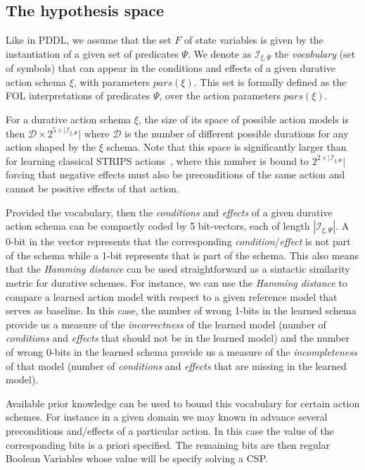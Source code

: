 \documentclass{ecai}
\begin{document}
\subsection{The hypothesis space}
\label{sec:action-space}



Like in PDDL, we assume that the set $F$ of state variables is given by the instantiation of a given set of predicates $\Psi$. We denote as ${\mathcal I}_{\xi,\Psi}$ the {\em vocabulary} (set of symbols) that can appear in the conditions and effects of a given durative action schema $\xi$, with parameters $pars(\xi)$. This set is formally defined as the FOL interpretations of predicates $\Psi$, over the action parameters $pars(\xi)$. 

For a durative action schema $\xi$, the size of its space of possible action models is then $\mathcal{D}\times 2^{5\times|{\mathcal I}_{\xi,\Psi}}|$ where $\mathcal{D}$ is the number of different possible durations for any action shaped by the $\xi$ schema. Note that this space is significantly larger than for learning classical STRIPS actions~\cite{yang2007learning}, where this number is bound to $2^{2\times|{\mathcal I}_{\xi,\Psi}}|$ forcing that negative effects must also be preconditions of the same action and cannot be positive effects of that action.

Provided the vocabulary, then the {\em conditions} and {\em effects} of a given durative action schema can be compactly coded by 5 bit-vectors, each of length $|{\mathcal I}_{\xi,\Psi}|$. A 0-bit in the vector represents that the corresponding {\em condition}/{\em effect} is not part of the schema while a 1-bit represents that is part of the schema. This also means that the {\em Hamming distance} can be used straightforward as a sintactic similarity metric for durative schemes. For instance, we can use the {\em Hamming distance} to compare a learned action model with respect to a given reference model that serves as baseline. In this case, the number of wrong 1-bits in the learned schema provide us a measure of the {\em incorrectness} of the learned model (number of {\em conditions} and {\em effects} that should not be in the learned model) and the number of wrong 0-bits in the learned schema provide us a measure of the {\em incompleteness} of that model (number of {\em conditions} and {\em effects} that are missing in the learned model). 

Available prior knowledge can be used to bound this vocabulary for certain action schemes. For instance in a given domain we may known in advance several preconditions and/effects of a particular action. In this case the value of the corresponding bits is a priori specified. The remaining bits are then regular Boolean Variables whose value will be specify solving a CSP.
\end{document}
